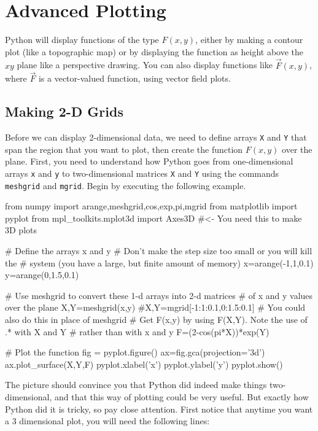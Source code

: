 \chapter{Advanced Plotting}
\label{chap:advancedplots}


Python will display functions of the type $F(x,y)$, either by
making a contour plot (like a topographic map) or by displaying the
function as height above the $xy$ plane like a perspective drawing.
You can also display functions like $\vec{F}(x,y)$, where $\vec{F}$
is a vector-valued function, using vector field plots.

\medskip

\section{Making 2-D Grids}

Before we can display 2-dimensional data, we need to define arrays
{\tt X} and {\tt Y} that span the region that you want to plot, then create
the function $F(x,y)$ over the plane.  First, you need to understand
how Python goes from
one-dimensional arrays \texttt{x} and \texttt{y} to two-dimensional
matrices \texttt{X} and \texttt{Y} using the commands {\tt
meshgrid} and {\tt mgrid}. Begin by executing the following
example.
\begin{codeexample}
\begin{VerbatimOut}{\listingFile}
from numpy import arange,meshgrid,cos,exp,pi,mgrid
from matplotlib import pyplot
from mpl_toolkits.mplot3d import Axes3D  #<- You need this to make 3D plots

# Define the arrays x and y
# Don't make the step size too small or you will kill the
# system (you have a large, but finite amount of memory)
x=arange(-1,1,0.1)
y=arange(0,1.5,0.1)

# Use meshgrid to convert these 1-d arrays into 2-d matrices
# of x and y values over the plane
X,Y=meshgrid(x,y)
#X,Y=mgrid[-1:1:0.1,0:1.5:0.1]  # You could also do this in place of meshgrid
# Get F(x,y) by using F(X,Y). Note the use of .* with X and Y
# rather than with x and y
F=(2-cos(pi*X))*exp(Y)

# Plot the function
fig = pyplot.figure()
ax=fig.gca(projection='3d')
ax.plot_surface(X,Y,F)
pyplot.xlabel('x')
pyplot.ylabel('y')
pyplot.show()
\end{VerbatimOut}
\end{codeexample}
The picture should convince you that Python did indeed make
things two-dimensional, and that this way of plotting could be very
useful. But exactly how Python did it is tricky, so pay close
attention.  First notice that anytime you want a 3 dimensional plot,
you will need the following lines:

